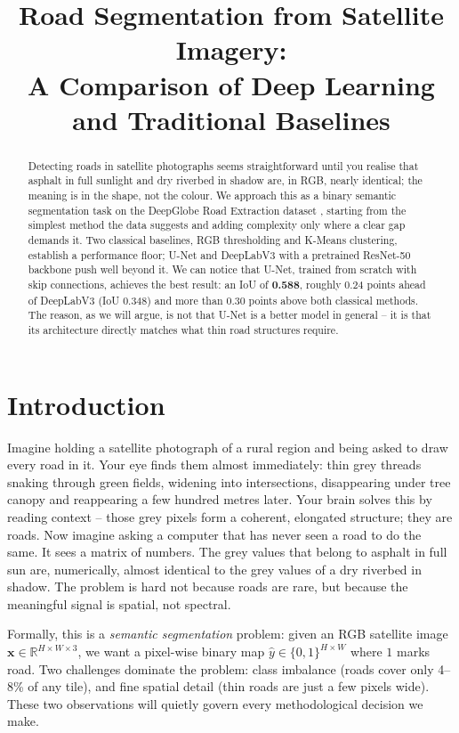 \documentclass[conference]{IEEEtran}
\title{Road Segmentation from Satellite Imagery:\\
A Comparison of Deep Learning and Traditional Baselines}
\author{
  \IEEEauthorblockN{William Wayn Monteiro, Maysa Xavier}
  \IEEEauthorblockA{COMP11069 -- Data Mining and Visualisation\\
  University of the West of Scotland\\
  2025/2026}
}
\begin{document}
\maketitle

\begin{abstract}
Detecting roads in satellite photographs seems straightforward until you realise that asphalt
in full sunlight and dry riverbed in shadow are, in RGB, nearly identical; the meaning is in
the shape, not the colour. We approach this as a binary semantic segmentation task on the
DeepGlobe Road Extraction dataset \cite{demir2018deepglobe}, starting from the simplest method
the data suggests and adding complexity only where a clear gap demands it. Two classical baselines,
RGB thresholding and K-Means clustering, establish a performance floor; U-Net
\cite{ronneberger2015unet} and DeepLabV3 \cite{chen2017deeplabv3} with a pretrained ResNet-50
backbone push well beyond it. We can notice that U-Net, trained from scratch with skip
connections, achieves the best result: an IoU of \textbf{0.588}, roughly 0.24 points ahead of
DeepLabV3 (IoU 0.348) and more than 0.30 points above both classical methods. The reason, as
we will argue, is not that U-Net is a better model in general -- it is that its architecture
directly matches what thin road structures require.
\end{abstract}

\section{Introduction}
\label{sec:intro}

Imagine holding a satellite photograph of a rural region and being asked to draw every road in it.
Your eye finds them almost immediately: thin grey threads snaking through green fields, widening
into intersections, disappearing under tree canopy and reappearing a few hundred metres later.
Your brain solves this by reading context -- those grey pixels form a coherent, elongated
structure; they are roads.
Now imagine asking a computer that has never seen a road to do the same.
It sees a matrix of numbers.
The grey values that belong to asphalt in full sun are, numerically, almost identical to the grey
values of a dry riverbed in shadow.
The problem is hard not because roads are rare, but because the meaningful signal is spatial,
not spectral.

Formally, this is a \textit{semantic segmentation} problem: given an RGB satellite image
$\mathbf{x} \in \mathbb{R}^{H \times W \times 3}$, we want a pixel-wise binary map
$\hat{y} \in \{0,1\}^{H \times W}$ where $1$ marks road.
Two challenges dominate the problem: class imbalance (roads cover only 4--8\% of any tile),
and fine spatial detail (thin roads are just a few pixels wide).
These two observations will quietly govern every methodological decision we make.
\end{document}
